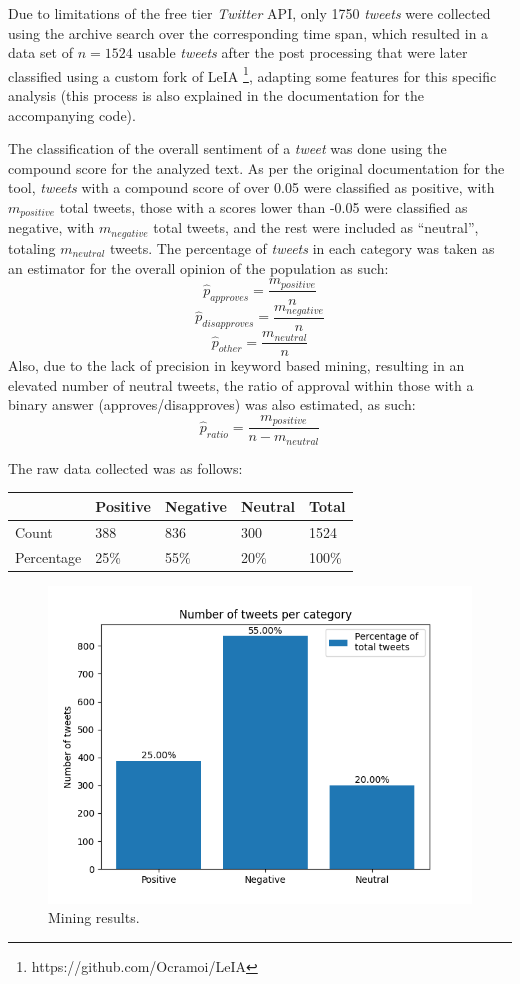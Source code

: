 \documentclass[conference]{IEEEtran}
\begin{document}
Due to limitations of the free tier \emph{Twitter} API, only 1750 \emph{tweets} were collected using the archive search over the corresponding time span, which resulted in a data set of \(n = 1524\) usable \emph{tweets} after the post processing that were later classified using a custom fork of LeIA \footnote{https://github.com/Ocramoi/LeIA}, adapting some features for this specific analysis (this process is also explained in the documentation for the accompanying code).

The classification of the overall sentiment of a \emph{tweet} was done using the compound score for the analyzed text. As per the original documentation for the tool, \emph{tweets} with a compound score of over 0.05 were classified as positive, with \(m_{positive}\) total tweets, those with a scores lower than -0.05 were classified as negative, with \(m_{negative}\) total tweets, and the rest were included as ``neutral'', totaling \(m_{neutral}\) tweets. The percentage of \emph{tweets} in each category was taken as an estimator for the overall opinion of the population as such:
$$ \hat{p}_{approves} = \frac{m_{positive}}{n} $$
$$ \hat{p}_{disapproves} = \frac{m_{negative}}{n} $$
$$ \hat{p}_{other} = \frac{m_{neutral}}{n} $$
Also, due to the lack of precision in keyword based mining, resulting in an elevated number of neutral tweets, the ratio of approval within those with a binary answer (approves/disapproves) was also estimated, as such:
$$ \hat{p}_{ratio} = \frac{m_{positive}}{n - m_{neutral}} $$

The raw data collected was as follows:
\begin{center}
\begin{tabular}{lllll}
 & Positive & Negative & Neutral & Total\\
\hline
Count & 388 & 836 & 300 & 1524\\
Percentage & 25\% & 55\% & 20\% & 100\%\\
\end{tabular}
\end{center}

\begin{figure}[H]
\centering
\includegraphics[width=\linewidth]{./ValsTwitter.png}
\caption{\label{fig:mined}Mining results.}
\end{figure}
\end{document}
